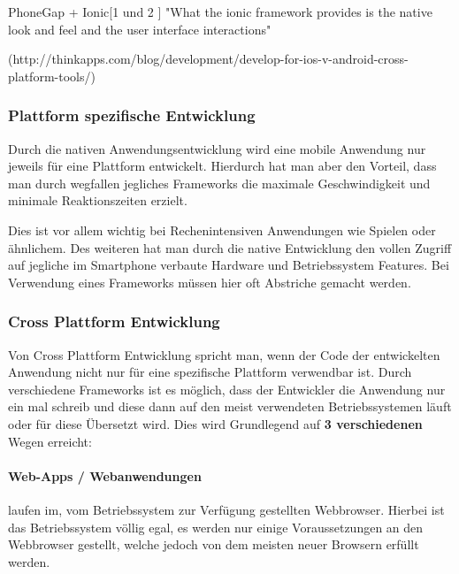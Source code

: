 PhoneGap + Ionic[1 und 2 ] %
"What the ionic framework provides is the native look and feel and the user interface interactions"


(http://thinkapps.com/blog/development/develop-for-ios-v-android-cross-platform-tools/) 

 
\subsubsection{Plattform spezifische Entwicklung}
Durch die nativen Anwendungsentwicklung wird eine mobile Anwendung nur jeweils für eine Plattform entwickelt. Hierdurch hat man aber den Vorteil, dass man durch wegfallen jegliches Frameworks die maximale Geschwindigkeit und minimale Reaktionszeiten erzielt.

Dies ist vor allem wichtig bei Rechenintensiven Anwendungen wie Spielen oder ähnlichem. Des weiteren hat man durch die native Entwicklung den vollen Zugriff auf jegliche im Smartphone verbaute Hardware und Betriebssystem Features. Bei Verwendung eines Frameworks müssen hier oft Abstriche gemacht werden.
\subsubsection{Cross Plattform Entwicklung}
Von Cross Plattform Entwicklung spricht man, wenn der Code der entwickelten Anwendung nicht nur für eine spezifische Plattform verwendbar ist. Durch verschiedene Frameworks ist es möglich, dass der Entwickler die Anwendung nur ein mal schreib und diese dann auf den meist verwendeten Betriebssystemen läuft oder für diese Übersetzt wird. Dies wird Grundlegend auf \textbf{3 verschiedenen} Wegen erreicht:

\paragraph{Web-Apps / Webanwendungen}laufen im, vom Betriebssystem zur Verfügung gestellten Webbrowser. Hierbei ist das Betriebssystem völlig egal, es werden nur einige Voraussetzungen an den Webbrowser gestellt, welche jedoch von dem meisten neuer Browsern erfüllt werden.

